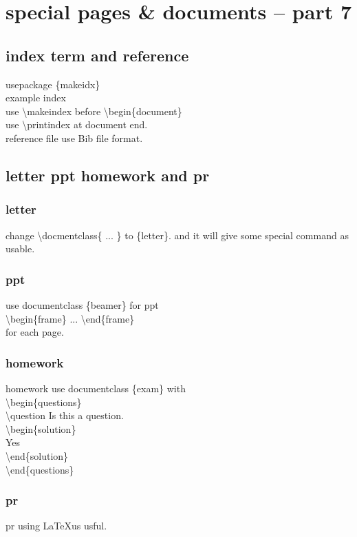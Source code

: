 \documentclass[11pt,a4paper]{article}
\begin{document}
\section{special pages \& documents -- part 7}{
  \subsection{index term and reference}{
    usepackage \{makeidx\}\\
    example index \\
    use \textbackslash{}makeindex before \textbackslash{}begin\{document\} \\
    use \textbackslash{}printindex at document end. \\
    reference file use Bib file format.
  }
  \subsection{letter ppt homework and pr}{
    \subsubsection{letter}
    change \textbackslash{}docmentclass\{ ... \} to \{letter\}.
    and it will give some special command as usable.

    \subsubsection{ppt}
    use documentclass \{beamer\} for ppt \\
    \textbackslash{}begin\{frame\} ... \textbackslash{}end\{frame\} \\
    for each page.\\

    \subsubsection{homework}
    homework use documentclass \{exam\} with \\
    \textbackslash{}begin\{questions\}\\
    \textbackslash{}question Is this a question.\\
    \textbackslash{}begin\{solution\}\\
    Yes\\
    \textbackslash{}end\{solution\}\\
    \textbackslash{}end\{questions\}\\

    \subsubsection{pr}
    pr using \LaTeX us usful.
  }
}
\end{document}
